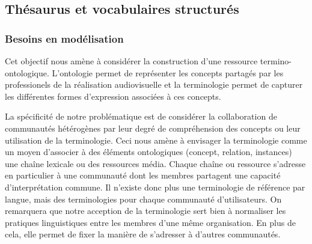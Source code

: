 


















\subsection{Thésaurus et vocabulaires structurés}
\subsubsection{Besoins en modélisation}
Cet objectif nous amène à considérer la construction d'une ressource termino-ontologique.
L'ontologie permet de représenter les concepts partagés par les professionels de la réalisation audiovisuelle et la terminologie permet de capturer les différentes formes d'expression associées à ces concepts. 

La spécificité de notre problématique est de considérer la collaboration de communautés hétérogènes par leur degré de compréhension des concepts ou leur utilisation de la terminologie. 
Ceci nous amène à envisager la terminologie comme un moyen d'associer à des éléments ontologiques (concept, relation, instances) une chaîne lexicale ou des ressources média.
Chaque chaîne ou ressource s'adresse en particulier à une communauté dont les membres partagent une capacité d'interprétation commune. 
Il n'existe donc plus une terminologie de référence par langue, mais des terminologies pour chaque communauté d'utilisateurs. 
On remarquera que notre acception de la terminologie sert bien à normaliser les pratiques linguistiques entre les membres d'une même organisation. 
En plus de cela, elle permet de fixer la manière de s'adresser à d'autres communautés.

